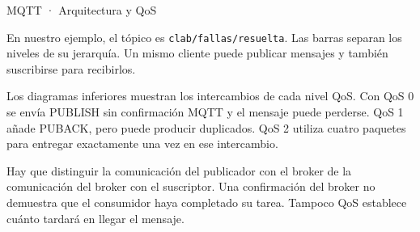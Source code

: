 \begin{frame}{MQTT · Arquitectura y QoS}
{\par
En nuestro ejemplo, el tópico es
\texttt{clab/fallas/resuelta}. Las barras separan los niveles
de su jerarquía. Un mismo cliente puede publicar mensajes
y también suscribirse para recibirlos.

\par
Los diagramas inferiores muestran los intercambios de cada
nivel QoS. Con QoS 0 se envía PUBLISH sin confirmación MQTT
y el mensaje puede perderse. QoS 1 añade PUBACK, pero puede
producir duplicados. QoS 2 utiliza cuatro paquetes para
entregar exactamente una vez en ese intercambio.

\par
Hay que distinguir la comunicación del publicador con el
broker de la comunicación del broker con el suscriptor.
Una confirmación del broker no demuestra que el consumidor
haya completado su tarea. Tampoco QoS establece cuánto
tardará en llegar el mensaje.
}
\end{frame}

